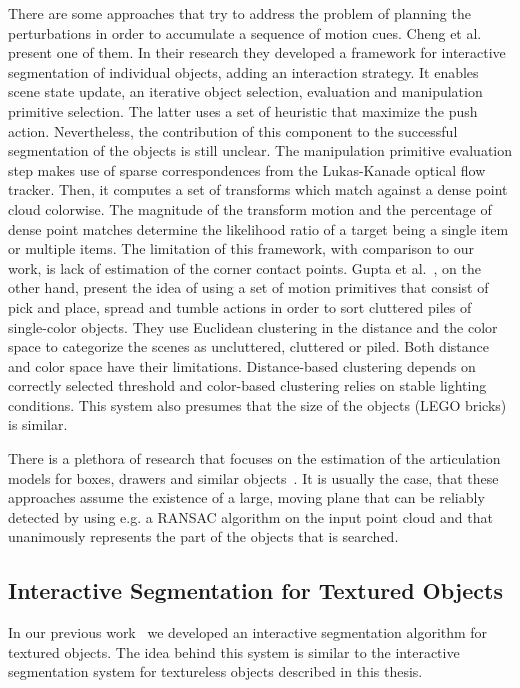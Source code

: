 There are some approaches that try to address the problem of planning the perturbations in order to accumulate a sequence of motion cues. Cheng et al.~\cite{chang11interactive} present one of them. In their research they developed a framework for interactive segmentation of individual objects, adding an interaction strategy. It enables scene state update, an iterative object selection, evaluation and manipulation primitive selection. The latter uses a set of heuristic that maximize the push action. Nevertheless, the contribution of this component to the successful segmentation of the objects is still unclear. The manipulation primitive evaluation step makes use of sparse correspondences from the Lukas-Kanade optical flow tracker. Then, it computes a set of transforms which match against a dense point cloud colorwise. The magnitude of the transform motion and the percentage of dense point matches determine the likelihood ratio of a target being a single item or multiple items. The limitation of this framework, with comparison to our work, is lack of estimation of the corner contact points.
Gupta et al.~\cite{gupta11primitives}, on the other hand, present the idea of using a set of motion primitives that consist of pick and place, spread and tumble actions in order to sort cluttered piles of single-color objects. They use Euclidean clustering in the distance and the color space to categorize the scenes as uncluttered, cluttered or piled. Both distance and color space have their limitations. Distance-based clustering depends on correctly selected threshold and color-based clustering relies on stable lighting conditions. This system also presumes that the size of the objects (LEGO bricks) is similar. 

There is a plethora of research that focuses on the estimation of the articulation models for boxes, drawers and similar objects~\cite{Box11Saxena,
  sturm10rss-workshop}. It is usually the case, that these approaches assume the existence of a large, moving plane that can be reliably detected by using e.g. a RANSAC algorithm on the input point cloud and that  unanimously represents the part of the objects that is searched.


\subsection{Interactive Segmentation for Textured Objects}
In our previous work~\cite{polishthesis,bersch12interactive} we developed an interactive segmentation algorithm for textured objects. The idea behind this system is similar to the interactive segmentation system for textureless objects described in this thesis.

